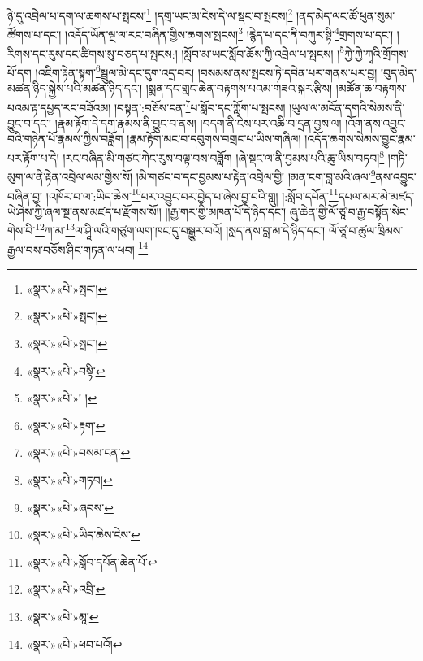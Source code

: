 ཉེ་དུ་འབྲེལ་པ་དག་ལ་ཆགས་པ་སྤངས།\footnote{«སྣར་»«པེ་»སྤང་།} །དགྲ་ཡང་མ་ངེས་དེ་ལ་སྡང་བ་སྤངས།\footnote{«སྣར་»«པེ་»སྤང་།} །ནད་མེད་ལང་ཚོ་ཕུན་སུམ་ཚོགས་པ་དང་། །འདོད་ཡོན་ལྔ་ལ་རང་བཞིན་གྱིས་ཆགས་སྤངས།\footnote{«སྣར་»«པེ་»སྤང་།} །རྙེད་པ་དང་ནི་བཀུར་སྟི་\footnote{«སྣར་»«པེ་»བསྟི་}གྲགས་པ་དང་། །རིགས་དང་རུས་དང་ཚིགས་སུ་བཅད་པ་སྤངས:། །སློབ་མ་ཡང་སློབ་ཆོས་ཀྱི་འབྲེལ་པ་སྤངས། །\footnote{«སྣར་»«པེ་»། །}ཀྱེ་ཀྱེ་ཀྭའི་གྲོགས་པོ་དག །འཇིག་རྟེན་སྟག་\footnote{«སྣར་»«པེ་»རྟག་}སྦྲུལ་མེ་དང་དུག་འདྲ་བར། །བསམས་ནས་སྤངས་ཏེ་དབེན་པར་གནས་པར་བྱ། །བུད་མེད་མཚན་ཉིད་སྐྱེས་པའི་མཚན་ཉིད་དང་། །སྨན་དང་གླང་ཆེན་བརྟགས་པའམ་གཟའ་སྐར་རྩིས། །མཚོན་ཆ་བརྟགས་པའམ་རྟ་དཔྱད་རང་བཟོའམ། །བསྟན་:བཅོས་ངན་\footnote{«སྣར་»«པེ་»བསམ་ངན་}པ་སློབ་དང་ཀློག་པ་སྤངས། །ཡུལ་ལ་མངོན་དགའི་སེམས་ནི་བྱུང་བ་དང་། །རྣམ་རྟོག་དེ་དག་རྣམས་ནི་བྱུང་བ་ནས། །བདག་ནི་ངེས་པར་འཆི་བ་དྲན་བྱས་ལ། །འོག་ནས་འབྱུང་བའི་གཉེན་པོ་རྣམས་ཀྱིས་བཟློག །རྣམ་རྟོག་མང་བ་དབུགས་བགྲང་པ་ཡིས་གཞིལ། །འདོད་ཆགས་སེམས་བྱུང་རྣམ་པར་རྟོག་པ་དེ། །རང་བཞིན་མི་གཙང་ཀེང་རུས་བལྟ་བས་བཟློག །ཞེ་སྡང་ལ་ནི་བྱམས་པའི་ཆུ་ཡིས་བཏབ།\footnote{«སྣར་»«པེ་»གཏབ།} །གཏི་མུག་ལ་ནི་རྟེན་འབྲེལ་ལམ་གྱིས་སོ། །མི་གཙང་བ་དང་བྱམས་པ་རྟེན་འབྲེལ་གྱི། །མན་ངག་བླ་མའི་ཞལ་\footnote{«སྣར་»«པེ་»ཞབས་}ནས་འབྱུང་བཞིན་བྱ། །འཁོར་བ་ལ་:ཡིད་ཆེས་\footnote{«སྣར་»«པེ་»ཡིད་ཆེས་ངེས་}པར་འབྱུང་བར་བྱེད་པ་ཞེས་བྱ་བའི་གླུ། །:སློབ་དཔོན་\footnote{«སྣར་»«པེ་»སློབ་དཔོན་ཆེན་པོ་}དཔལ་མར་མེ་མཛད་ཡེ་ཤེས་ཀྱི་ཞལ་སྔ་ནས་མཛད་པ་རྫོགས་སོ།། །།རྒྱ་གར་གྱི་མཁན་པོ་དེ་ཉིད་དང་། ཞུ་ཆེན་གྱི་ལོ་ཙཱ་བ་རྒྱ་བསྟོན་སེང་གེས་བི་\footnote{«སྣར་»«པེ་»འབྲི་}ཀ་མ་\footnote{«སྣར་»«པེ་»མཱ་}ལ་ཤཱི་ལའི་གཙུག་ལག་ཁང་དུ་བསྒྱུར་བའོ། །སླད་ནས་བླ་མ་དེ་ཉིད་དང་། ལོ་ཙཱ་བ་ཚུལ་ཁྲིམས་རྒྱལ་བས་བཅོས་ཤིང་གཏན་ལ་ཕབ། \footnote{«སྣར་»«པེ་»ཕབ་པའོ། }